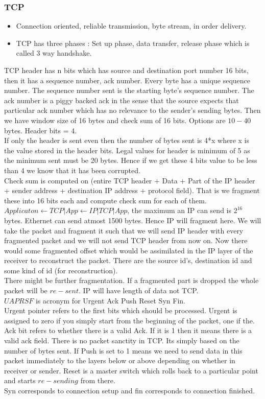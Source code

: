 \documentclass[solution,addpoints,12pt]{exam}
\begin{document}
\subsubsection{TCP}
\begin{itemize}
\item Connection oriented, reliable transmission, byte stream, in
order delivery.
\item TCP has three phases : Set up phase, data transfer, release phase
which is called 3 way handshake.
\end{itemize}
TCP header has n bits which has source and destination
port number 16 bits, then it has a sequence number,
ack number. Every byte has a unique sequence number.
The sequence number sent is the starting byte's sequence number.
The ack number is a piggy backed ack in the sense that the source expects that
particular ack number which has no relevance to the sender's sending bytes.
Then we have window size of 16 bytes and check sum of 16 bits.
Options are $10-40$ bytes. Header bits = 4.\\
If only the header is sent even then the number of bytes sent is 4*x
where x is the value stored in the header bits.
Legal values for header is minimum of 5 as the minimum
sent must be 20 bytes. Hence if we get these 4 bits value to be less than 4
we know that it has been corrupted.\\
Check sum is computed on (entire TCP header + Data + Part of the IP header
+ sender address + destination IP address + protocol field). That is we
fragment these into 16 bits each and compute check sum for each of them.\\

$Applicaton \leftarrow TCP|App \leftarrow IP|TCP|App$, the maximum
an IP can send is $2^{16}$ bytes. Ethernet can send atmost 1500 bytes.
Hence IP will fragment here. We will take the packet and fragment
it such that we will send IP header with every fragmented packet and
we will not send TCP header from now on. Now there would some
fragmented offset which would be assimilated in the IP layer
of the receiver to reconstruct the packet. There are the source id's,
destination id and some kind of id (for reconstruction).\\
There might be further fragmentation. If a fragmented part is dropped
the whole packet will be $re-sent$. IP will have length of data not TCP.\\

$UAPRSF$ is acronym for Urgent Ack Push Reset Syn Fin.\\
Urgent pointer refers to the first bits which should be processed. Urgent is
assigned to zero if you simply start from the beginning of the packet,
one if the. Ack bit refers to whether there is a valid Ack. If it is 1 then
it means there is a valid ack field. There is no packet sanctity in TCP.
Its simply based on the number of bytes sent. If Push is set to 1 means we
need to send data in this packet immediately to the layers below or above
depending on whether in receiver or sender. Reset is a master switch
which rolls back to a particular point and starts $re-sending$ from there.\\
Syn corresponds to connection setup and fin corresponds to
connection finished.\\
\end{document}
